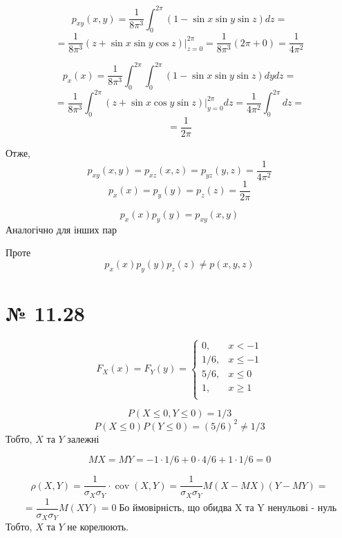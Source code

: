 \documentclass[11pt, a4paper]{article} %
\begin{document}
$$p_{xy}(x,y) = \frac{1}{8\pi^3} \int_0^{2\pi} (1-\sin x\sin y\sin z) dz = $$
$$= \frac{1}{8\pi^3} (z+\sin x\sin y\cos z) |_{z=0}^{2\pi} = \frac{1}{8\pi^3} (2\pi + 0) = \frac{1}{4\pi^2}$$

$$p_{x}(x) = \frac{1}{8\pi^3} \int_0^{2\pi}\int_0^{2\pi} (1-\sin x\sin y\sin z) dydz = $$
$$= \frac{1}{8\pi^3} \int_0^{2\pi} (z+\sin x\cos y\sin z) |_{y=0}^{2\pi} dz = \frac{1}{4\pi^2} \int_0^{2\pi} dz = $$
$$= \frac{1}{2\pi}$$

Отже,
$$p_{xy}(x,y) = p_{xz}(x,z) = p_{yz}(y,z) =\frac{1}{4\pi^2} $$
$$p_x(x) = p_y(y) = p_z(z) = \frac{1}{2\pi}$$

$$p_x(x)p_y(y) = p_{xy}(x,y)$$
Аналогічно для інших пар

Проте
$$p_x(x)p_y(y)p_z(z) \ne p(x,y,z)$$
\qedsymbol

\section*{№ 11.28}
$$F_X(x) = F_Y(y) = \begin{cases}
    0,& x<-1\\
    1/6,& x\le -1\\ 
    5/6,& x\le 0\\ 
    1,& x\ge 1\\ 
\end{cases}$$

$$P(X\le 0, Y\le 0) = 1/3$$
$$P(X\le 0)P(Y\le 0) = (5/6)^2 \ne 1/3$$
Тобто, $X$ та $Y$ залежні

$$MX = MY = -1\cdot 1/6 + 0\cdot 4/6 + 1 \cdot 1/6 = 0$$

$$\rho(X,Y) = \frac{1}{\sigma_X \sigma_Y} \cdot \operatorname{cov}(X,Y) = \frac{1}{\sigma_X \sigma_Y} M(X-MX)(Y-MY) = $$
$$=\frac{1}{\sigma_X \sigma_Y} M(XY) = 0 \;\text{Бо ймовірність, що обидва X та Y ненульові - нуль}$$
Тобто, $X$ та $Y$ не корелюють. 
\end{document}
